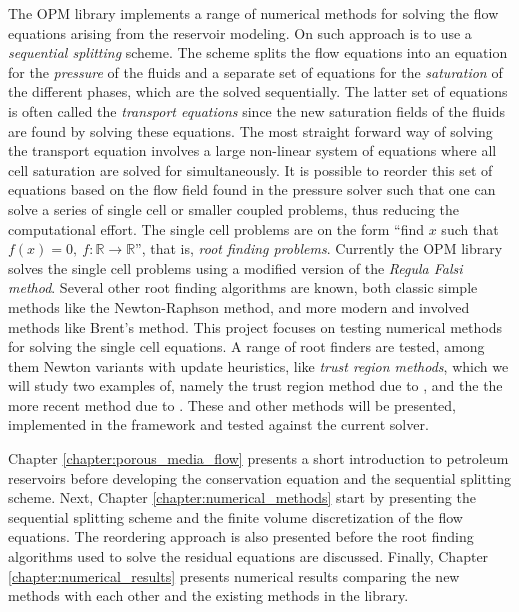 The OPM library implements a range of numerical methods for solving the flow equations arising from the reservoir modeling. On such approach is to use a \emph{sequential splitting} scheme. The scheme splits the flow equations into an equation for the \emph{pressure} of the fluids and a separate set of equations for the \emph{saturation} of the different phases, which are the solved sequentially. The latter set of equations is often called the \emph{transport equations} since the new saturation fields of the fluids are found by solving these equations. The most straight forward way of solving the transport equation involves a large non-linear system of equations where all cell saturation are solved for simultaneously. It is possible to reorder this set of equations based on the flow field found in the pressure solver such that one can solve a series of single cell or smaller coupled problems, thus reducing the computational effort. The single cell problems are on the form ``find $x$ such that $f(x) = 0,~f\colon\mathbb{R}\to\mathbb{R}$'', that is, \emph{root finding problems}. Currently the OPM library solves the single cell problems using a modified version of the \emph{Regula Falsi method}. Several other root finding algorithms are known, both classic simple methods like the Newton-Raphson method, and more modern and involved methods like Brent's method. This project focuses on testing numerical methods for solving the single cell equations. A range of root finders are tested, among them Newton variants with update heuristics, like \emph{trust region methods}, which we will study two examples of, namely the trust region method due to \citet{jenny_unconditionally_2009}, and the the more recent method due to \citet{wang_trust-region_2013}. These and other methods will be presented, implemented in the \opm framework and tested against the current solver.

Chapter \ref{chapter:porous_media_flow} presents a short introduction to petroleum reservoirs before developing the conservation equation and the sequential splitting scheme. Next, Chapter \ref{chapter:numerical_methods} start by presenting the sequential splitting scheme and the finite volume discretization of the flow equations. The reordering approach is also presented before the root finding algorithms used to solve the residual equations are discussed. Finally, Chapter \ref{chapter:numerical_results} presents numerical results comparing the new methods with each other and the existing methods in the \opm library.
\newpage